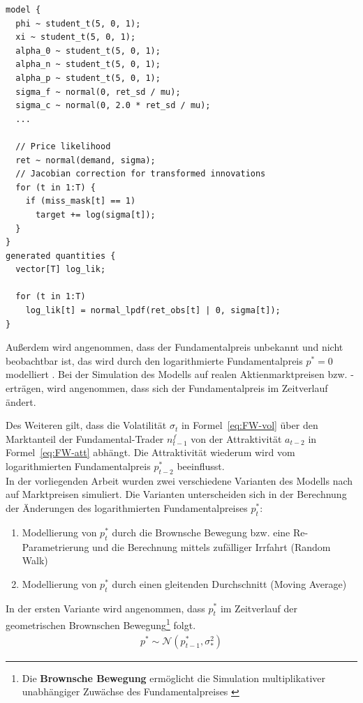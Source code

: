 \documentclass[ngerman]{ttlab-qualify}
\begin{document}
\begin{lstlisting}[style=custom]
model {
  phi ~ student_t(5, 0, 1);
  xi ~ student_t(5, 0, 1);
  alpha_0 ~ student_t(5, 0, 1);
  alpha_n ~ student_t(5, 0, 1);
  alpha_p ~ student_t(5, 0, 1);
  sigma_f ~ normal(0, ret_sd / mu);
  sigma_c ~ normal(0, 2.0 * ret_sd / mu);
  ...

  // Price likelihood
  ret ~ normal(demand, sigma);
  // Jacobian correction for transformed innovations
  for (t in 1:T) {
    if (miss_mask[t] == 1)
      target += log(sigma[t]);
  }
}
generated quantities {
  vector[T] log_lik;

  for (t in 1:T)
    log_lik[t] = normal_lpdf(ret_obs[t] | 0, sigma[t]);
}
\end{lstlisting}

Außerdem wird angenommen, dass der Fundamentalpreis unbekannt und nicht beobachtbar ist, das wird durch den logarithmierte Fundamentalpreis $p^*=0$ modelliert \parencite{bertschinger:2018, FW:2011}. Bei der Simulation des Modells auf realen Aktienmarktpreisen bzw. -erträgen, wird angenommen, dass sich der Fundamentalpreis im Zeitverlauf ändert.

Des Weiteren gilt, dass die Volatilität $\sigma_t$ in Formel~\ref{eq:FW-vol} über den Marktanteil der Fundamental-Trader $n_{t-1}^f$ von der Attraktivität $a_{t-2}$ in Formel~\ref{eq:FW-att} abhängt. Die Attraktivität wiederum wird vom logarithmierten Fundamentalpreis $p_{t-2}^*$ beeinflusst. \\ 

In der vorliegenden Arbeit wurden zwei verschiedene Varianten des Modells nach \parencite{bertschinger:2018} auf Marktpreisen simuliert. Die Varianten unterscheiden sich in der Berechnung der Änderungen des logarithmierten Fundamentalpreises $p_t^*$:
\begin{enumerate}
\item Modellierung von $p_t^*$ durch die Brownsche Bewegung bzw. eine Re-Parametrierung und die Berechnung mittels zufälliger Irrfahrt (Random Walk)
\item Modellierung von $p_t^*$ durch einen gleitenden Durchschnitt (Moving Average)
\end{enumerate}
In der ersten Variante wird angenommen, dass $p_t^*$ im Zeitverlauf der geometrischen Brownschen Bewegung\footnote{Die \textbf{Brownsche Bewegung} ermöglicht die Simulation multiplikativer unabhängiger Zuwächse des Fundamentalpreises \parencite{BrownianMotion}} folgt.
\begin{align}
\label{eq:FW-p_star}
p^*\sim \mathcal{N}(p_{t-1}^*,\sigma_*^2)
\end{align}
\end{document}
